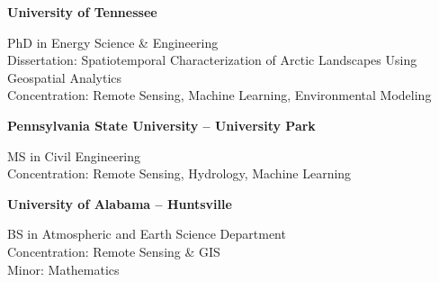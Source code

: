 \documentclass{tidycv} %
\begin{document}
\begin{cveducations}
  
    {{\bf University of Tennessee}} %
    {
    \begin{cveducationitems} %
        PhD in Energy Science \& Engineering  \\ Dissertation: Spatiotemporal  Characterization of Arctic Landscapes Using Geospatial Analytics \\ Concentration: Remote Sensing, Machine Learning, Environmental Modeling \\
	\end{cveducationitems}
    }
    
    {{\bf Pennsylvania State University -- University Park}} %
    {
    \begin{cveducationitems} %
        MS in Civil Engineering \\ Concentration: Remote Sensing, Hydrology, Machine Learning\\
	\end{cveducationitems}
    }
    
    {{\bf University of Alabama -- Huntsville}} %
    {
    \begin{cveducationitems} %
        BS in Atmospheric and Earth Science Department\\ Concentration: Remote Sensing \& GIS \\ Minor: Mathematics\\
	\end{cveducationitems}
    }    
    
    
\end{cveducations}
\end{document}
